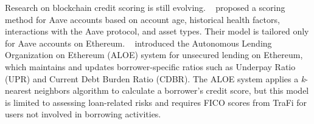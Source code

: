\documentclass[runningheads]{llncs}
\begin{document}
{Research on blockchain credit scoring is still evolving. \citeauthor{wolf2022scoring}~\cite{wolf2022scoring} proposed a scoring method for Aave accounts based on account age, historical health factors, interactions with the Aave protocol, and asset types. %
Their model is tailored only for Aave accounts on Ethereum. %
\citeauthor{austin2023autonomous}~\cite{austin2023autonomous} introduced the Autonomous Lending Organization on Ethereum (ALOE) system for unsecured lending on Ethereum, which maintains and updates borrower-specific ratios such as Underpay Ratio (UPR) and Current Debt Burden Ratio (CDBR). The ALOE system applies a \textit{k}-nearest neighbors algorithm to calculate a borrower’s credit score, but this model is limited to assessing loan-related risks and requires FICO scores from TraFi for users not involved in borrowing activities.

}
\end{document}
